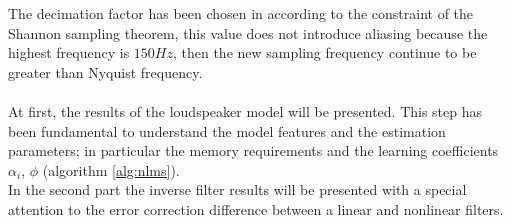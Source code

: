 The decimation factor has been chosen in according to the constraint of the Shannon sampling theorem, this value does not introduce aliasing because the highest frequency is $150Hz$, then the new sampling frequency continue to be greater than Nyquist frequency.\\\\
At first, the results of the loudspeaker model will be presented. This step has been fundamental to understand the model features and the estimation parameters; in particular the memory requirements and the learning coefficients $\alpha_i$, $\phi$ (algorithm \ref{alg:nlms}).\\
In the second part the inverse filter results will be presented with a special attention to the error correction difference between a linear and nonlinear filters.